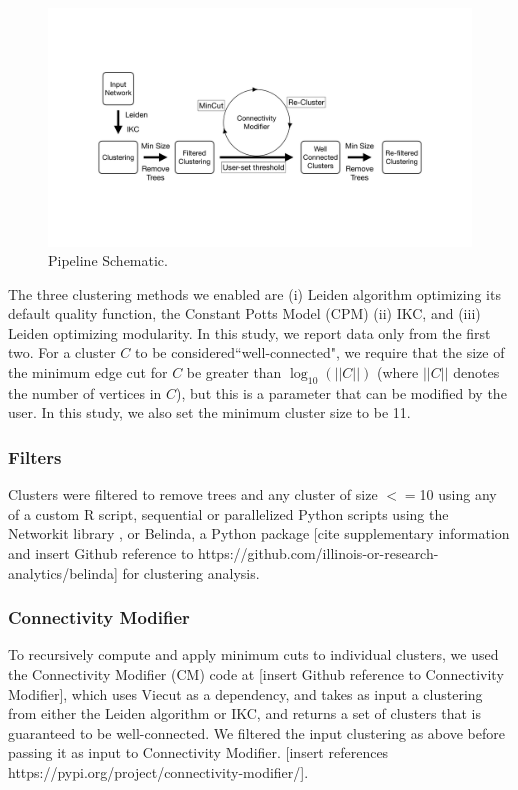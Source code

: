 \documentclass[12pt, oneside]{article}   	%
\begin{document}
\vspace{2 mm}

\begin{figure}[H]
\centering
\includegraphics[width=0.7\linewidth]{workflow.pdf}
\caption{Pipeline Schematic.}
\end{figure}

The three clustering methods we enabled are (i) Leiden algorithm optimizing its default quality function, the Constant Potts Model (CPM) (ii) IKC, and (iii) Leiden optimizing modularity. In this study, we report data only from the first two. 
For  a cluster $C$ to be considered``well-connected", we require that the size of the minimum edge cut for $C$ be greater than $\log_{10}(||C||)$ (where $||C||$ denotes the number of vertices in $C$), but this is a parameter that can be modified by the user.  In this study, we also set the minimum cluster size to be 11. 



\subsubsection{Filters} Clusters were filtered to remove trees and any cluster of size $<=$10 using any of a custom R script, sequential or parallelized Python scripts using the Networkit library \citep{Staudt2016}, or Belinda, a Python package [cite supplementary information and insert Github reference to https://github.com/illinois-or-research-analytics/belinda] for clustering analysis.

\subsubsection{Connectivity Modifier} To recursively compute and apply minimum cuts to individual clusters, we used the Connectivity Modifier (CM) code at [insert Github reference to Connectivity Modifier], which uses Viecut \citep{Henzinger2018,Henzinger2019} as a dependency, and takes as input a clustering from either the Leiden algorithm or IKC, and returns a set of clusters that is guaranteed to be
well-connected. 
We filtered the input clustering as above before passing it as input to Connectivity Modifier. [insert references https://pypi.org/project/connectivity-modifier/].
\end{document}
